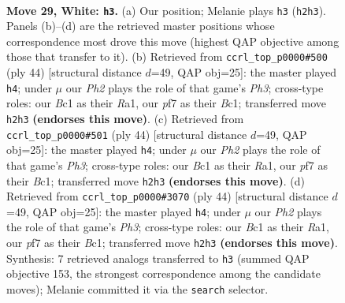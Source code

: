 \documentclass[11pt]{article}
\begin{document}
\clearpage

\begin{figure}[p]\centering
\begin{subfigure}{0.46\textwidth}\centering
\resizebox{\linewidth}{!}{%
\newchessgame
\chessboard[
  setfen={br1r4/p2p1pk1/8/2R1p2p/8/5nP1/PP3P1P/2BK1B1R w - - 6 29},
  showmover=false,
  pgfstyle=straightmove, color=movearrow, markmove={h2-h3}
]}
\caption{}
\end{subfigure}\hfill
\begin{subfigure}{0.46\textwidth}\centering
\resizebox{\linewidth}{!}{%
\newchessgame
\chessboard[
  setfen={r1b1k2r/5p2/1p6/4p1Pp/3nP3/7P/PP6/R1BBK2R w KQkq - 0 23},
  showmover=false,
  pgfstyle=straightmove, color=movearrow, markmove={h3-h4}
]}
\caption{}
\end{subfigure}
\\[4pt]
\begin{subfigure}{0.46\textwidth}\centering
\resizebox{\linewidth}{!}{%
\newchessgame
\chessboard[
  setfen={r1b1k2r/5p2/1p6/4p1Pp/3nP3/7P/PP6/R1BBK2R w KQkq - 0 23},
  showmover=false,
  pgfstyle=straightmove, color=movearrow, markmove={h3-h4}
]}
\caption{}
\end{subfigure}\hfill
\begin{subfigure}{0.46\textwidth}\centering
\resizebox{\linewidth}{!}{%
\newchessgame
\chessboard[
  setfen={r1b1k2r/5p2/1p6/4p1Pp/3nP3/7P/PP6/R1BBK2R w KQkq - 0 23},
  showmover=false,
  pgfstyle=straightmove, color=movearrow, markmove={h3-h4}
]}
\caption{}
\end{subfigure}
\caption{\textbf{Move 29, White: \texttt{h3}.} (a) Our position; Melanie plays \texttt{h3} (\texttt{h2h3}). Panels (b)--(d) are the retrieved master positions whose correspondence most drove this move (highest QAP objective among those that transfer to it). (b) Retrieved from \texttt{ccrl\_top\_p0000\#500} (ply 44) [structural distance $d$=49, QAP obj=25]: the master played \texttt{h4}; under $\mu$ our \emph{Ph2} plays the role of that game's \emph{Ph3}; cross-type roles: our \emph{B}c1 as their \emph{R}a1, our \emph{p}f7 as their \emph{B}c1; transferred move \texttt{h2h3} \textbf{(endorses this move)}. (c) Retrieved from \texttt{ccrl\_top\_p0000\#501} (ply 44) [structural distance $d$=49, QAP obj=25]: the master played \texttt{h4}; under $\mu$ our \emph{Ph2} plays the role of that game's \emph{Ph3}; cross-type roles: our \emph{B}c1 as their \emph{R}a1, our \emph{p}f7 as their \emph{B}c1; transferred move \texttt{h2h3} \textbf{(endorses this move)}. (d) Retrieved from \texttt{ccrl\_top\_p0000\#3070} (ply 44) [structural distance $d$=49, QAP obj=25]: the master played \texttt{h4}; under $\mu$ our \emph{Ph2} plays the role of that game's \emph{Ph3}; cross-type roles: our \emph{B}c1 as their \emph{R}a1, our \emph{p}f7 as their \emph{B}c1; transferred move \texttt{h2h3} \textbf{(endorses this move)}. Synthesis: 7 retrieved analogs transferred to \texttt{h3} (summed QAP objective 153, the strongest correspondence among the candidate moves); Melanie committed it via the \texttt{search} selector.}
\label{fig:thought-m56}
\end{figure}
\end{document}
